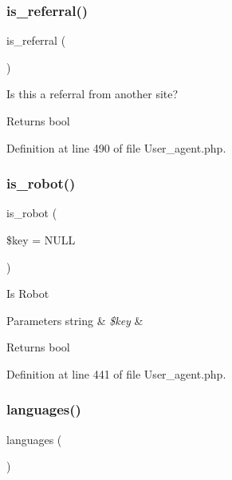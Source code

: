\subsubsection{\texorpdfstring{is\_referral()}{is\_referral()}}
{\footnotesize\ttfamily is\+\_\+referral (\begin{DoxyParamCaption}{ }\end{DoxyParamCaption})}

Is this a referral from another site?

\begin{DoxyReturn}{Returns}
bool 
\end{DoxyReturn}


Definition at line 490 of file User\+\_\+agent.\+php.

\mbox{\label{class_c_i___user__agent_aaf9eed8184635473476a24f6a850815c}} 
\subsubsection{\texorpdfstring{is\_robot()}{is\_robot()}}
{\footnotesize\ttfamily is\+\_\+robot (\begin{DoxyParamCaption}\item[{}]{\$key = {\ttfamily NULL} }\end{DoxyParamCaption})}

Is Robot


\begin{DoxyParams}[1]{Parameters}
string & {\em \$key} & \\
\hline
\end{DoxyParams}
\begin{DoxyReturn}{Returns}
bool 
\end{DoxyReturn}


Definition at line 441 of file User\+\_\+agent.\+php.

\mbox{\label{class_c_i___user__agent_adda8fc15b6fe0efc05a50d2645189c77}} 
\subsubsection{\texorpdfstring{languages()}{languages()}}
{\footnotesize\ttfamily languages (\begin{DoxyParamCaption}{ }\end{DoxyParamCaption})}

